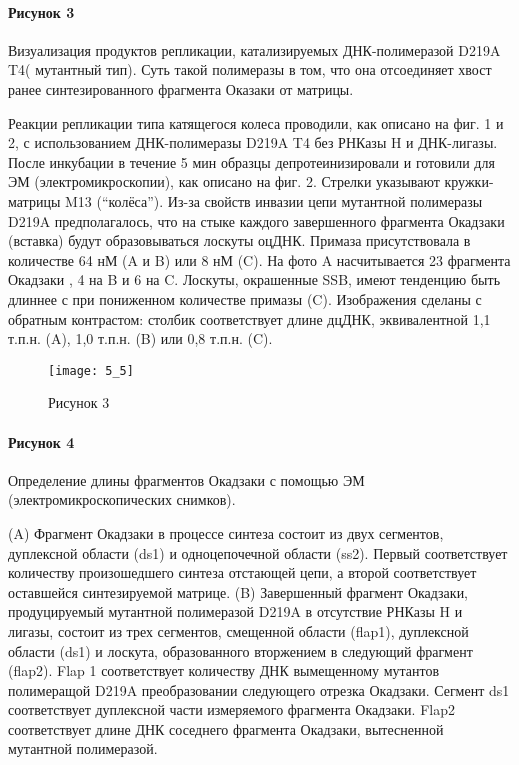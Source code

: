 \paragraph{Рисунок 3}

Визуализация продуктов репликации, катализируемых ДНК-полимеразой D219A T4( мутантный тип). Суть такой полимеразы в том, что она отсоединяет хвост ранее синтезированного фрагмента Оказаки от матрицы.

Реакции репликации типа катящегося колеса проводили, как описано на фиг. 1 и 2, с использованием ДНК-полимеразы D219A T4 без РНКазы H и ДНК-лигазы.  После инкубации в течение 5 мин образцы депротеинизировали и готовили для ЭМ (электромикроскопии), как описано на фиг. 2. Стрелки указывают кружки-матрицы M13 (“колёса”).  Из-за свойств инвазии цепи мутантной полимеразы D219A предполагалось, что на стыке каждого завершенного фрагмента Окадзаки (вставка) будут образовываться лоскуты оцДНК.  Примаза присутствовала в количестве 64 нМ (A и B) или 8 нМ (C).  На фото A насчитывается 23 фрагмента Окадзаки , 4 на B и 6 на C. Лоскуты, окрашенные SSB, имеют тенденцию быть длиннее с при пониженном количестве примазы (C).  Изображения сделаны с обратным контрастом: столбик соответствует длине дцДНК, эквивалентной 1,1 т.п.н. (A), 1,0 т.п.н. (B) или 0,8 т.п.н. (C).

\begin{figure}[h]
    \centering
    \texttt{[image: 5\_5]}
    \caption{Рисунок 3}
    \label{fig:5_5}
\end{figure}

\paragraph{Рисунок 4}

Определение длины фрагментов Окадзаки с помощью ЭМ (электромикроскопических снимков).

(A)	Фрагмент Окадзаки в процессе синтеза состоит из двух сегментов, дуплексной области (ds1) и одноцепочечной области (ss2).  Первый соответствует количеству произошедшего синтеза отстающей цепи, а второй соответствует оставшейся синтезируемой матрице.
(B)	Завершенный фрагмент Окадзаки, продуцируемый мутантной полимеразой D219A в отсутствие РНКазы H и лигазы, состоит из трех сегментов, смещенной области (flap1), дуплексной области (ds1) и лоскута, образованного вторжением в следующий фрагмент (flap2).  Flap 1 соответствует количеству ДНК  вымещенному мутантов полимеращой D219A преобразовании следующего отрезка Окадзаки.  Сегмент ds1 соответствует дуплексной части измеряемого фрагмента Окадзаки.  Flap2 соответствует длине ДНК соседнего фрагмента Окадзаки, вытесненной мутантной полимеразой.

